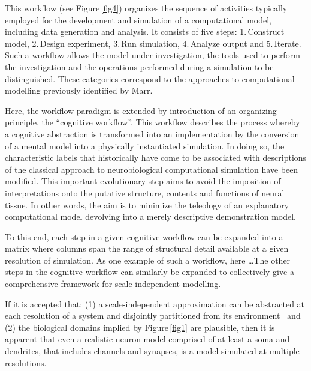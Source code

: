 \documentclass[10pt,letterpaper]{article}
\begin{document}
This workflow (see Figure\,\ref{fig4}) organizes the sequence of activities typically employed for the development and simulation of a computational model, including data generation and analysis.  It consists of five steps: 1.\,Construct model, 2.\,Design experiment, 3.\,Run simulation, 4.\,Analyze output and 5.\,Iterate.  Such a workflow allows the model under investigation, the tools used to perform the investigation and the operations performed during a simulation to be distinguished. These categories correspond to the approaches to computational modelling previously identified by Marr.

Here, the workflow paradigm is extended by introduction of an organizing principle, the “cognitive workflow”. This workflow describes the process whereby a cognitive abstraction is transformed into an implementation by the conversion of a mental model into a physically instantiated simulation. In doing so, the characteristic labels that historically have come to be associated with descriptions of the classical approach to neurobiological computational simulation have been modified. This important evolutionary step aims to avoid the imposition of interpretations onto the putative structure, contents and functions of neural tissue. In other words, the aim is to minimize the teleology of an explanatory computational model devolving into a merely descriptive demonstration model.

To this end, each step in a given cognitive workflow can be expanded into a matrix where columns span the range of structural detail available at a given resolution of simulation.  As one example of such a workflow, here \ldots  The other steps in the cognitive workflow can similarly be expanded to collectively give a comprehensive framework for scale-independent modelling.

If it is accepted that: (1) a scale-independent approximation can be abstracted at each resolution of a system and disjointly partitioned from its environment~\cite{Bertalanffy:1973zr, Heylighen:2006vn} and (2) the biological domains implied by Figure\,\ref{fig1} are plausible, then it is apparent that even a realistic neuron model comprised of at least a soma and dendrites, that includes channels and synapses, is a model simulated at multiple resolutions.
\end{document}
